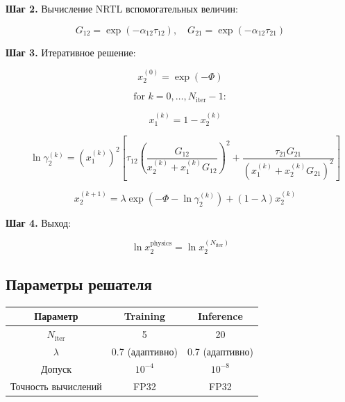\documentclass[11pt]{article}
\begin{document}
\textbf{Шаг 2.} Вычисление NRTL вспомогательных величин:

\begin{equation*}
G_{12} = \exp(-\alpha_{12}\tau_{12}), \quad G_{21} = \exp(-\alpha_{12}\tau_{21})
\end{equation*}

\textbf{Шаг 3.} Итеративное решение:

\begin{equation*}
x_2^{(0)} = \exp(-\Phi)
\end{equation*}

\begin{equation*}
\text{for } k = 0, \ldots, N_{\mathrm{iter}} - 1:
\end{equation*}

\begin{equation*}
\quad x_1^{(k)} = 1 - x_2^{(k)}
\end{equation*}

\begin{equation*}
\quad \ln \gamma_2^{(k)} = (x_1^{(k)})^2 \left[\tau_{12}\!\left(\frac{G_{12}}{x_2^{(k)} + x_1^{(k)} G_{12}}\right)^{2} + \frac{\tau_{21}G_{21}}{(x_1^{(k)} + x_2^{(k)} G_{21})^2}\right]
\end{equation*}

\begin{equation*}
\quad x_2^{(k+1)} = \lambda \exp\!\left(-\Phi - \ln\gamma_2^{(k)}\right) + (1 - \lambda) x_2^{(k)}
\end{equation*}

\textbf{Шаг 4.} Выход:

\begin{equation*}
\ln x_2^{\mathrm{physics}} = \ln x_2^{(N_{\mathrm{iter}})}
\end{equation*}

\subsection{Параметры решателя}

\begin{center}
\begin{tabular}{|c|c|c|}
\hline
Параметр & Training & Inference \\
\hline
$N_{\mathrm{iter}}$ & 5 & 20 \\
\hline
$\lambda$ & 0.7 (адаптивно) & 0.7 (адаптивно) \\
\hline
Допуск & $10^{-4}$ & $10^{-8}$ \\
\hline
Точность вычислений & FP32 & FP32 \\
\hline
\end{tabular}
\end{center}
\end{document}
